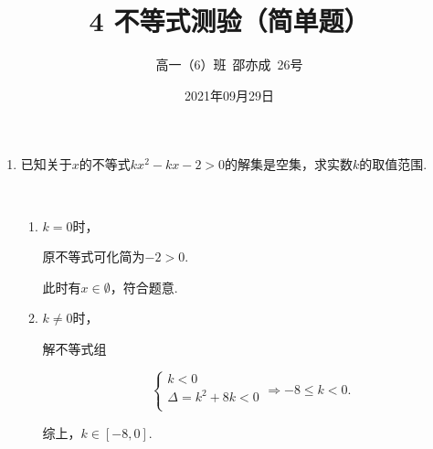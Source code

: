 \documentclass[8pt]{article}
\author{高一（6）班\ 邵亦成\ 26号}
\title{4 不等式测验（简单题）}
\date{2021年09月29日}
\begin{document}
	\maketitle

	\begin{enumerate}
		
		\item
			已知关于$x$的不等式$kx^2-kx-2>0$的解集是空集，求实数$k$的取值范围.

			~\\
			\begin{enumerate} [$1^\circ$]
				\item
					$k=0$时，

					原不等式可化简为$-2>0$.

					此时有$x\in \emptyset$，符合题意.

				\item
					$k\neq 0$时，

					解不等式组

					$$
						\left\{
						\begin{array} {c}
							k<0\\
							\Delta=k^2+8k<0\\
						\end{array}
						\right.\Rightarrow-8\leq k<0.
					$$

				综上，$k\in [-8,0].$

			\end{enumerate}

	\end{enumerate}
\end{document}
